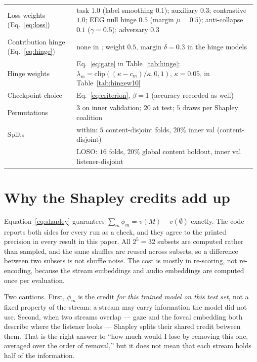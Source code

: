 \begin{table}[h]
\begin{tabular}{@{}ll@{}}
Loss weights (Eq.~\ref{eq:loss})       & task $1.0$ (label smoothing $0.1$); auxiliary $0.3$; contrastive $1.0$; EEG null hinge $0.5$ (margin $\mu=0.5$); anti-collapse $0.1$ ($\gamma=0.5$); adversary $0.3$ \\
Contribution hinge (Eq.~\ref{eq:hinge}) & none in \merit{}; weight $0.5$, margin $\delta=0.3$ in the hinge models \\
Hinge weights                           & Eq.~\ref{eq:gate} in Table~\ref{tab:hinge}; $\lambda_m=\mathrm{clip}((\kappa-c_m)/\kappa,0,1)$, $\kappa=0.05$, in Table~\ref{tab:hingew10} \\
Checkpoint choice                       & Eq.~\ref{eq:criterion}, $\beta=1$ (accuracy recorded as well) \\
Permutations                            & $3$ on inner validation; $20$ at test; $5$ draws per Shapley coalition\\
Splits                                  & within: $5$ content-disjoint folds, $20\%$ inner val (content-disjoint)\\
                                        & LOSO: $16$ folds, $20\%$ global content holdout, inner val listener-disjoint\\
\bottomrule
\end{tabular}
\end{table}

\section{Why the Shapley credits add up}
\label{app:additivity}

Equation~\ref{eq:shapley} guarantees $\sum_m\phi_m=v(M)-v(\emptyset)$ exactly.
The code reports both sides for every run as a check, and they agree to the
printed precision in every result in this paper. All $2^5=32$ subsets are
computed rather than sampled, and the same shuffles are reused across subsets, so
a difference between two subsets is not shuffle noise. The cost is mostly in
re-scoring, not re-encoding, because the stream embeddings and audio embeddings
are computed once per evaluation.

Two cautions. First, $\phi_m$ is the credit \emph{for this trained model on this
test set}, not a fixed property of the stream: a stream may carry information the
model did not use. Second, when two streams overlap --- gaze and the foveal
embedding both describe where the listener looks --- Shapley splits their shared
credit between them. That is the right answer to ``how much would I lose by
removing this one, averaged over the order of removal,'' but it does not mean that
each stream holds half of the information.


